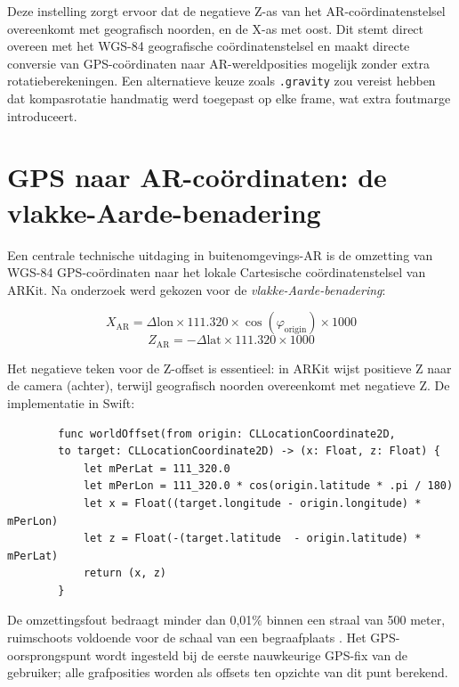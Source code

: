 Deze instelling zorgt ervoor dat de negatieve Z-as van het AR-coördinatenstelsel overeenkomt met geografisch noorden, en de X-as met oost. Dit stemt direct overeen met het WGS-84 geografische coördinatenstelsel en maakt directe conversie van GPS-coördinaten naar AR-wereldposities mogelijk zonder extra rotatieberekeningen. Een alternatieve keuze zoals \texttt{.gravity} zou vereist hebben dat kompasrotatie handmatig werd toegepast op elke frame, wat extra foutmarge introduceert.

\section{GPS naar AR-coördinaten: de vlakke-Aarde-benadering}
\label{sec:gpsconversie}

Een centrale technische uitdaging in buitenomgevings-AR is de omzetting van WGS-84 GPS-coördinaten naar het lokale Cartesische coördinatenstelsel van ARKit. Na onderzoek werd gekozen voor de \textit{vlakke-Aarde-benadering}:

\[
X_{\text{AR}} = \Delta\text{lon} \times 111{.}320 \times \cos(\varphi_{\text{origin}}) \times 1000
\]
\[
Z_{\text{AR}} = -\Delta\text{lat} \times 111{.}320 \times 1000
\]

Het negatieve teken voor de Z-offset is essentieel: in ARKit wijst positieve Z naar de camera (achter), terwijl geografisch noorden overeenkomt met negatieve Z. De implementatie in Swift:

\begin{listing}[H]
    \begin{verbatim}
        func worldOffset(from origin: CLLocationCoordinate2D,
        to target: CLLocationCoordinate2D) -> (x: Float, z: Float) {
            let mPerLat = 111_320.0
            let mPerLon = 111_320.0 * cos(origin.latitude * .pi / 180)
            let x = Float((target.longitude - origin.longitude) * mPerLon)
            let z = Float(-(target.latitude  - origin.latitude) * mPerLat)
            return (x, z)
        }
    \end{verbatim}
    \caption[GPS naar ARKit coördinatenomzetting]{Vlakke-Aarde omzetting van GPS naar ARKit-wereldcoördinaten.}
\end{listing}

De omzettingsfout bedraagt minder dan 0,01\% binnen een straal van 500 meter, ruimschoots voldoende voor de schaal van een begraafplaats \autocite{Xu2018}. Het GPS-oorsprongspunt wordt ingesteld bij de eerste nauwkeurige GPS-fix van de gebruiker; alle grafposities worden als offsets ten opzichte van dit punt berekend.

